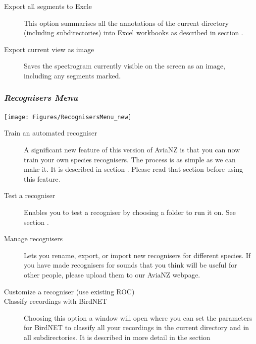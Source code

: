 \documentclass{scrartcl}
\begin{document}
\begin{description}
\item[Export all segments to Excle] This option summarises all the annotations of the current directory (including subdirectories) into Excel workbooks as described in section .
\item [Export current view as image] Saves the spectrogram currently visible on the screen as an image, including any segments marked. 
\end{description}

\subsubsection{\textit{Recognisers Menu}}

\begin{center}
\texttt{[image: Figures/RecognisersMenu\_new]}
\end{center}

\begin{description}
\item [Train an automated recogniser] A significant new feature of this version of AviaNZ is that you can now train your own species recognisers. The process is as simple as we can make it. It is described in section . Please read that section before using this feature.
\item [Test a recogniser] Enables you to test a recogniser by choosing a folder to run it on. See section .
\item[Manage recognisers] Lets you rename, export, or import new recognisers for different species. 
If you have made recognisers for sounds that you think will be useful for other people, please upload them to our AviaNZ webpage.   
\item[Customize a recogniser (use existing ROC)]
\item[Classify recordings with BirdNET] Choosing this option a window will open where you can set the parameters for BirdNET to classify all your recordings in the current directory and in all subdirectories. It is described in more detail in the section 
\end{description}
\end{document}
